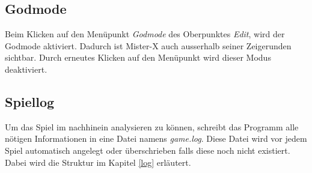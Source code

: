         \subsection{Godmode}
            Beim Klicken auf den Menüpunkt \textit{Godmode} des Oberpunktes \textit{Edit}, wird der Godmode aktiviert.
            Dadurch ist Mister-X auch ausserhalb seiner Zeigerunden sichtbar. Durch erneutes Klicken auf den Menüpunkt
            wird dieser Modus deaktiviert.

        \subsection{Spiellog}
            Um das Spiel im nachhinein analysieren zu können, schreibt das Programm alle nötigen Informationen in eine Datei
            namens \textit{game.log}. Diese Datei wird vor jedem Spiel automatisch angelegt oder überschrieben falls diese noch
            nicht existiert. Dabei wird die Struktur im Kapitel \ref{log} erläutert.
